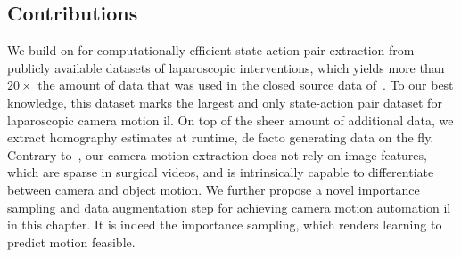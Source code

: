 \subsection{Contributions}
We build on  for computationally efficient state-action pair extraction from publicly available datasets of laparoscopic interventions, which yields more than $20\times$ the amount of data that was used in the closed source data of~\cite{li2022learning}. To our best knowledge, this dataset marks the largest and only state-action pair dataset for laparoscopic camera motion \gls{il}. On top of the sheer amount of additional data, we extract homography estimates at runtime, de facto generating data on the fly. Contrary to~\cite{li2022learning}, our camera motion extraction does not rely on image features, which are sparse in surgical videos, and is intrinsically capable to differentiate between camera and object motion. We further propose a novel importance sampling and data augmentation step for achieving camera motion automation \gls{il} in this chapter. It is indeed the importance sampling, which renders learning to predict motion feasible.










